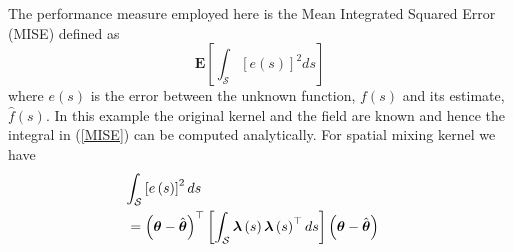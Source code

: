 \documentclass[11pt,draftcls,onecolumn,peerreview]{IEEEtran}
\begin{document}
 The performance measure employed here is the Mean Integrated Squared Error (MISE) defined as
\begin{equation}
 \mathbf{E}\left[\int_{\mathcal{S}}\left[e\left(s\right) \right]^2ds  \right]
\label{MISE} 
\end{equation}
 where  $e\left(s\right)$ is the error between the unknown function, $f\left( s\right) $ and its estimate, $\hat{f}\left( s\right) $. In this example the original kernel and the field are known and hence the integral in  (\ref{MISE}) can be computed analytically. For spatial mixing kernel we have
\begin{eqnarray}
 \lefteqn{\int_{\mathcal{S}}\left[e\left(s\right)\right]^2ds}\nonumber \\  &=\left(\boldsymbol{\theta}-\hat{\boldsymbol{\theta}}\right)^\top\left[ \int_{\mathcal{S}}\boldsymbol\lambda\left(s\right)\boldsymbol\lambda\left(s\right)^\top ds\right] \left(\boldsymbol{\theta}-\hat{\boldsymbol{\theta}}\right)&
\label{MISEKernel}
\end{eqnarray}
\end{document}
